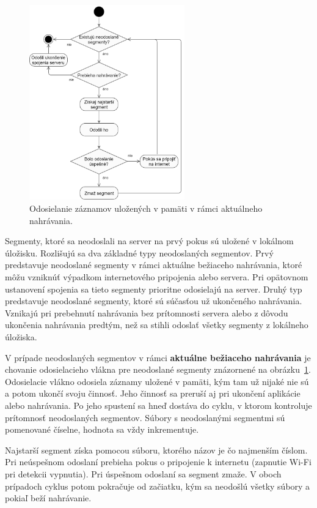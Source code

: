 \begin{figure}[!hbt]
	\centering
	\includegraphics[width=0.6\textwidth]{obrazky-figures/sending_unsent.png}
	\caption{Odosielanie záznamov uložených v pamäti v rámci aktuálneho nahrávania.}
	\label{sending-unsent-pic}
\end{figure}


Segmenty, ktoré sa neodoslali na server na prvý pokus sú uložené v lokálnom úložisku. Rozlišujú sa dva základné typy neodoslaných segmentov. Prvý predstavuje neodoslané segmenty v rámci aktuálne bežiaceho nahrávania, ktoré môžu vzniknúť výpadkom internetového pripojenia alebo servera. Pri opätovnom ustanovení spojenia sa tieto segmenty prioritne odosielajú na server. Druhý typ predstavuje neodoslané segmenty, ktoré sú súčasťou už ukončeného nahrávania. Vznikajú pri prebehnutí nahrávania bez prítomnosti servera alebo z dôvodu ukončenia nahrávania predtým, než sa stihli odoslať všetky segmenty z lokálneho úložiska.

V prípade neodoslaných segmentov v rámci \textbf{aktuálne bežiaceho nahrávania} je chovanie odosielacieho vlákna pre neodoslané segmenty znázornené na obrázku~\ref{sending-unsent-pic}.
Odosielacie vlákno odosiela záznamy uložené v pamäti, kým tam už nijaké nie sú a potom ukončí svoju činnosť. Jeho činnosť sa preruší aj pri ukončení aplikácie alebo nahrávania. Po jeho spustení sa hneď dostáva do cyklu, v ktorom kontroluje prítomnosť neodoslaných segmentov. Súbory s neodoslanými segmentmi sú pomenované číselne, hodnota sa vždy inkrementuje. 

Najstarší segment získa pomocou súboru, ktorého názov je čo najmenším číslom. Pri neúspešnom odoslaní prebieha pokus o pripojenie k internetu (zapnutie Wi-Fi pri detekcii vypnutia). Pri úspešnom odoslaní sa segment zmaže. V oboch prípadoch cyklus potom pokračuje od začiatku, kým sa neodošlú všetky súbory a pokiaľ beží nahrávanie.

